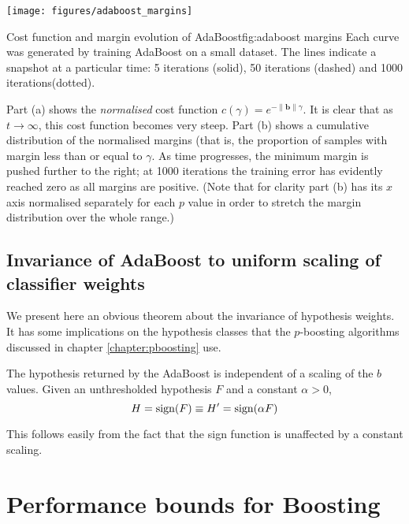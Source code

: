 \begin{linefigure}
\begin{center}
\texttt{[image: figures/adaboost\_margins]}
\end{center}
\begin{capt}{Cost function and margin evolution of
AdaBoost}{fig:adaboost margins}
Each curve was generated by training AdaBoost on a small dataset.  The
lines indicate a snapshot at a particular time: 5 iterations (solid),
50 iterations (dashed) and 1000 iterations(dotted).

Part (a) shows the \emph{normalised} cost function $c(\gamma) =
e^{-\|\mathbf{b}\| \gamma}$.  It is clear that as $t \rightarrow \infty$,
this cost function becomes very steep.  Part (b) shows a cumulative
distribution of the normalised margins (that is, the proportion of
samples with margin less than or equal to $\gamma$.  As time
progresses, the minimum margin is pushed further to the right; at 1000
iterations the training error has evidently reached zero as all
margins are positive.  (Note that for clarity part (b) has its $x$
axis normalised separately for each $p$ value in order to stretch the
margin distribution over the whole range.)
\end{capt}
\end{linefigure}


\subsection{Invariance of AdaBoost to uniform scaling of classifier
weights}

We present here an obvious theorem about the invariance of hypothesis
weights.  It has some implications on the hypothesis classes that the
$p$-boosting algorithms discussed in chapter \ref{chapter:pboosting}
use.

\begin{theorem}
\label{thm:invariance}
The hypothesis returned by the AdaBoost is independent of a 
scaling of the $b$ values.  Given an unthresholded hypothesis $F$ and
a constant $\alpha > 0$,
%
\begin{equation}
H = \mathrm{sign}(F) \equiv H' = \mathrm{sign}(\alpha F) 
\end{equation}
\end{theorem}

\proof This follows easily from the fact that the sign function is
unaffected by a constant scaling.



\section{Performance bounds for Boosting}

